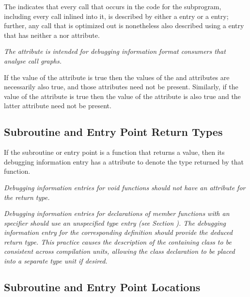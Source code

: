 The \DWATcallallsourcecallsNAME{}
indicates that every call that occurs in the
code for the subprogram, including every call inlined into it, is described by either a 
\DWTAGcallsite{} entry or a \DWTAGinlinedsubroutine{} entry; further, any call
that is optimized out is nonetheless also described using a \DWTAGcallsite{} entry 
that has neither a \DWATcallpc{} nor \DWATcallreturnpc{} attribute.

\textit{The \DWATcallallsourcecallsNAME{} attribute is intended for debugging 
information format consumers that analyse call graphs.}

If the value of the \DWATcallallsourcecalls{} attribute is true then the values of the
\DWATcallallcalls{} and \DWATcallalltailcalls{} attributes are necessarily also true, and 
those attributes need not be present. Similarly, if the value of the 
\DWATcallallcalls{} attribute is true then the value of the \DWATcallalltailcalls{} 
attribute is also true and the latter attribute need not be present.

\subsection{Subroutine and Entry Point Return Types}
\label{chap:subroutineandentrypointreturntypes}

If 
\hypertarget{chap:DWATtypetypeofsubroutinereturn}{}
the subroutine or entry point 
is a function that returns a
value, then its debugging information entry has 
a \DWATtype{} attribute 
to denote the type returned by that function.

\textit{Debugging information entries for 
 void functions should
not have an attribute for the return type.  }

\textit{Debugging information entries for declarations of  
member functions with an 
\autoreturntype{} specifier should use an unspecified type entry (see 
Section ). 
The debugging information entry for the corresponding definition
should provide the deduced return type.  This practice causes the description of
the containing class to be consistent across compilation units, allowing the class
declaration to be placed into a separate type unit if desired.}


\subsection{Subroutine and Entry Point Locations}
\label{chap:subroutineandentrypointlocations}

